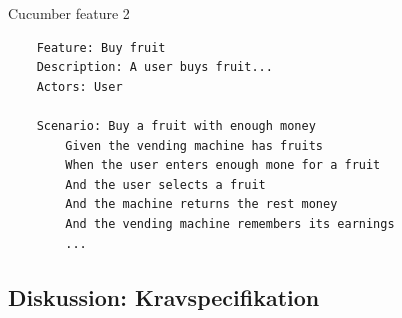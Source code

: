 \begin{listing}[H]
    \centering
    \caption{Cucumber feature 2}\label{lst:feature2}
    \begin{verbatim}
    Feature: Buy fruit
    Description: A user buys fruit...
    Actors: User
    
    Scenario: Buy a fruit with enough money
        Given the vending machine has fruits
        When the user enters enough mone for a fruit
        And the user selects a fruit
        And the machine returns the rest money
        And the vending machine remembers its earnings
        ...
    \end{verbatim}
\end{listing}

\subsection{Diskussion: Kravspecifikation}